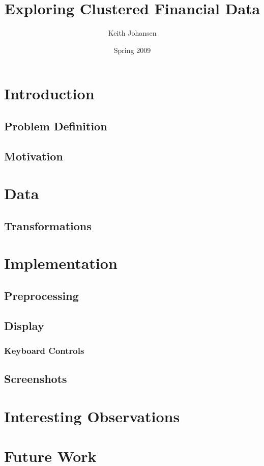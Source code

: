 \documentclass{article}
\author{Keith Johansen}
\title{Exploring Clustered Financial Data}
\date{Spring 2009}
\begin{document}
\maketitle

\begin{abstract}
 
\end{abstract}


\begin{multicols}{2}
\section{Introduction}
\subsection{Problem Definition}

\subsection{Motivation}

\section{Data}
\subsection{Transformations}

\section{Implementation}
\subsection{Preprocessing}
\subsection{Display}
\subsubsection{Keyboard Controls}
\subsection{Screenshots}


\section{Interesting Observations}

\section{Future Work}

\end{multicols}
\end{document}

